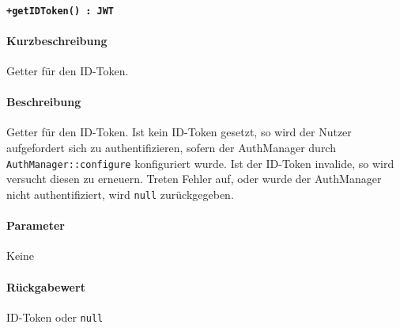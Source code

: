 \paragraph{\texttt{+getIDToken() : JWT}}%
\paragraph*{Kurzbeschreibung}
Getter für den ID-Token.
\paragraph*{Beschreibung}
Getter für den ID-Token.
Ist kein ID-Token gesetzt, so wird der Nutzer aufgefordert sich zu authentifizieren, sofern der AuthManager durch \verb#AuthManager::configure# konfiguriert wurde.
Ist der ID-Token invalide, so wird versucht diesen zu erneuern.
Treten Fehler auf, oder wurde der AuthManager nicht authentifiziert, wird \verb#null# zurückgegeben.
\paragraph*{Parameter}
Keine
\paragraph*{Rückgabewert}
ID-Token oder \verb#null#